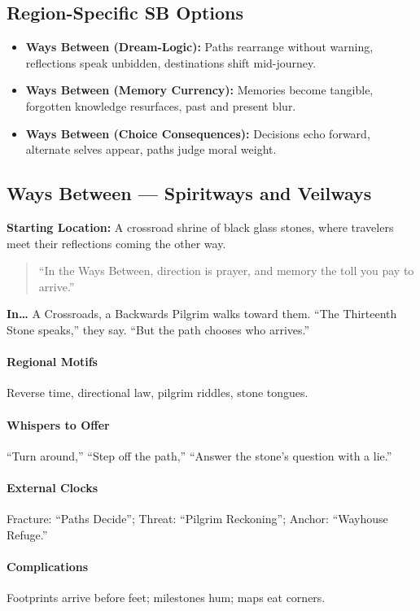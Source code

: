 \subsection*{Region-Specific SB Options}
\begin{itemize}
\item \textbf{Ways Between (Dream-Logic):} Paths rearrange without warning, reflections speak unbidden, destinations shift mid-journey.
\item \textbf{Ways Between (Memory Currency):} Memories become tangible, forgotten knowledge resurfaces, past and present blur.
\item \textbf{Ways Between (Choice Consequences):} Decisions echo forward, alternate selves appear, paths judge moral weight.
\end{itemize}


\subsection*{Ways Between — Spiritways and Veilways}
\textbf{Starting Location:} A crossroad shrine of black glass stones, where travelers meet their reflections coming the other way.
\begin{quote}
“In the Ways Between, direction is prayer, and memory the toll you pay to arrive.”
\end{quote}

\textbf{In…} A Crossroads, a Backwards Pilgrim walks toward them. ``The Thirteenth Stone speaks,'' they say. ``But the path chooses who arrives.''
\paragraph{Regional Motifs} Reverse time, directional law, pilgrim riddles, stone tongues.
\paragraph{Whispers to Offer} ``Turn around,'' ``Step off the path,'' ``Answer the stone’s question with a lie.''
\paragraph{External Clocks} Fracture: ``Paths Decide''; Threat: ``Pilgrim Reckoning''; Anchor: ``Wayhouse Refuge.''
\paragraph{Complications} Footprints arrive before feet; milestones hum; maps eat corners.
